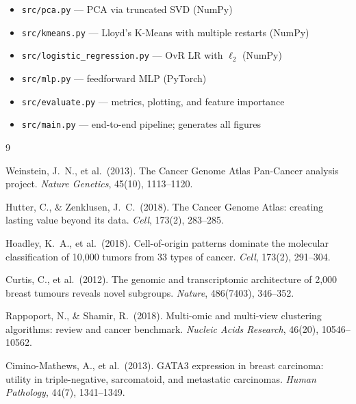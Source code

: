 \documentclass[11pt,letterpaper]{article}
\begin{document}
\begin{itemize}[leftmargin=2em,itemsep=0pt]
  \item \texttt{src/pca.py} --- PCA via truncated SVD (NumPy)
  \item \texttt{src/kmeans.py} --- Lloyd's K-Means with multiple restarts (NumPy)
  \item \texttt{src/logistic\_regression.py} --- OvR LR with $\ell_2$ (NumPy)
  \item \texttt{src/mlp.py} --- feedforward MLP (PyTorch)
  \item \texttt{src/evaluate.py} --- metrics, plotting, and feature importance
  \item \texttt{src/main.py} --- end-to-end pipeline; generates all figures
\end{itemize}


\begin{thebibliography}{9}

Weinstein, J.~N., et al.\ (2013).
The Cancer Genome Atlas Pan-Cancer analysis project.
\textit{Nature Genetics}, 45(10), 1113--1120.

Hutter, C., \& Zenklusen, J.~C.\ (2018).
The Cancer Genome Atlas: creating lasting value beyond its data.
\textit{Cell}, 173(2), 283--285.

Hoadley, K.~A., et al.\ (2018).
Cell-of-origin patterns dominate the molecular classification of
10,000 tumors from 33 types of cancer.
\textit{Cell}, 173(2), 291--304.

Curtis, C., et al.\ (2012).
The genomic and transcriptomic architecture of 2,000 breast tumours reveals
novel subgroups.
\textit{Nature}, 486(7403), 346--352.

Rappoport, N., \& Shamir, R.\ (2018).
Multi-omic and multi-view clustering algorithms: review and cancer benchmark.
\textit{Nucleic Acids Research}, 46(20), 10546--10562.

Cimino-Mathews, A., et al.\ (2013).
GATA3 expression in breast carcinoma: utility in triple-negative, sarcomatoid,
and metastatic carcinomas.
\textit{Human Pathology}, 44(7), 1341--1349.

\end{thebibliography}
\end{document}
